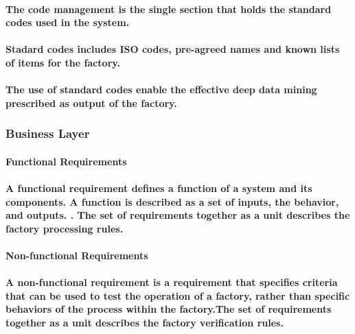 \documentclass{acm_proc_article-sp}
\begin{document}
\paragraph{The code management is the single section that holds the standard codes used in the system.}
\paragraph{Stadard codes includes ISO codes, pre-agreed names and known lists of items for the factory.}
\paragraph{The use of standard codes enable the effective deep data mining prescribed as output of the factory.}
\subsubsection{Business Layer}
\paragraph{Functional Requirements}
\paragraph{A functional requirement defines a function of a system and its components. A function is described as a set of inputs, the behavior, and outputs. \cite{roman1985taxonomy}. The set of requirements together as a unit describes the factory processing rules.}
\paragraph{Non-functional Requirements}
\paragraph{A non-functional requirement is a requirement that specifies criteria that can be used to test the operation of a factory, rather than specific behaviors of the process within the factory.The set of requirements together as a unit describes the factory verification rules.}
\end{document}
